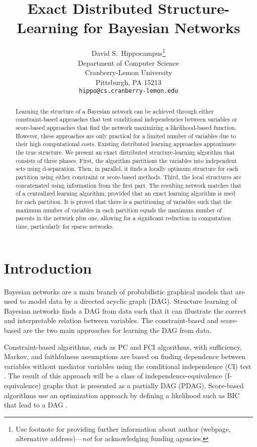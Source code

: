 \documentclass{article}
\title{Exact Distributed Structure-Learning for Bayesian Networks}
\author{%
  David S.~Hippocampus\thanks{Use footnote for providing further information
    about author (webpage, alternative address)---\emph{not} for acknowledging
    funding agencies.} \\
  Department of Computer Science\\
  Cranberry-Lemon University\\
  Pittsburgh, PA 15213 \\
  \texttt{hippo@cs.cranberry-lemon.edu} \\
}
\begin{document}
\maketitle


\begin{abstract}
Learning the structure of a Bayesian network can be achieved through either constraint-based approaches that test conditional independencies between variables or score-based approaches that find the network maximizing a likelihood-based function. However, these approaches are only practical for a limited number of variables due to their high computational costs. Existing distributed learning approaches approximate the true structure. We present an exact distributed structure-learning algorithm that consists of three phases. First, the algorithm partitions the variables into independent sets using d-separation. Then, in parallel, it finds a locally optimum structure for each partition using either constraint or score-based methods. Third, the local structures are concatenated using information from the first part. The resulting network matches that of a centralized learning algorithm, provided that an exact learning algorithm is used for each partition.
It is proved that there is a partitioning of variables such that the maximum number of variables in each partition equals the maximum number of parents in the network plus one, allowing for a significant reduction in computation time, particularly for sparse networks.
\end{abstract}

\section{Introduction}
Bayesian networks are a main branch of probabilistic graphical models that are used to model data by a directed acyclic graph (DAG).
Structure learning of Bayesian networks finds a DAG from data such that it can illustrate the correct and interpretable relation between variables\cite{2022boom}.
The constraint-based and score-based are the two main approaches for learning the DAG from data.\cite{2021kitson}

Constraint-based algorithms, such as PC and FCI algorithms, with sufficiency, Markov, and faithfulness assumptions are based on finding dependence between variables without mediator variables using the conditional independence (CI) test \cite{2020cheng}. 
The result of this approach will be a class of independence-equivalence (I-equivalence) graphs that is presented as a partially DAG (PDAG)\cite{koller}. 
Score-based algorithms use an optimization approach by defining a likelihood such as BIC that lead to a DAG \cite{koller}.
\end{document}
